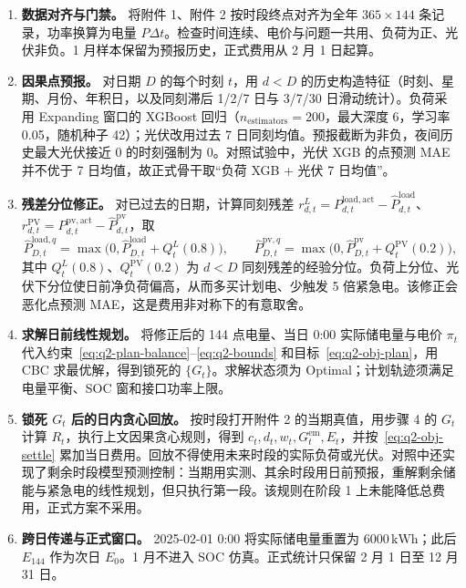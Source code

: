 \begin{enumerate}[label=\textbf{步骤\arabic*},leftmargin=2.6em,itemsep=0.45em]
\item \textbf{数据对齐与门禁。}
将附件 1、附件 2 按时段终点对齐为全年 \(365\times 144\) 条记录，功率换算为电量 \(P\Delta t\)。检查时间连续、电价与问题一共用、负荷为正、光伏非负。1 月样本保留为预报历史，正式费用从 2 月 1 日起算。

\item \textbf{因果点预报。}
对日期 \(D\) 的每个时刻 \(t\)，用 \(d<D\) 的历史构造特征（时刻、星期、月份、年积日，以及同刻滞后 1/2/7 日与 3/7/30 日滑动统计）。负荷采用 Expanding 窗口的 XGBoost 回归（\(n_{\mathrm{estimators}}=200\)，最大深度 6，学习率 0.05，随机种子 42）；光伏改用过去 7 日同刻均值。预报截断为非负，夜间历史最大光伏接近 0 的时刻强制为 0。对照试验中，光伏 XGB 的点预测 MAE 并不优于 7 日均值，故正式骨干取“负荷 XGB + 光伏 7 日均值”。

\item \textbf{残差分位修正。}
对已过去的日期，计算同刻残差 \(r_{d,t}^{L}=P_{d,t}^{\mathrm{load,act}}-\hat{P}_{d,t}^{\mathrm{load}}\)、\(r_{d,t}^{\mathrm{PV}}=P_{d,t}^{\mathrm{pv,act}}-\hat{P}_{d,t}^{\mathrm{pv}}\)，取
\[
\hat{P}_{D,t}^{\mathrm{load},q}
=\max\bigl(0,\hat{P}_{D,t}^{\mathrm{load}}+Q_t^{L}(0.8)\bigr),\qquad
\hat{P}_{D,t}^{\mathrm{pv},q}
=\max\bigl(0,\hat{P}_{D,t}^{\mathrm{pv}}+Q_t^{\mathrm{PV}}(0.2)\bigr),
\]
其中 \(Q_t^{L}(0.8)\)、\(Q_t^{\mathrm{PV}}(0.2)\) 为 \(d<D\) 同刻残差的经验分位。负荷上分位、光伏下分位使日前净负荷偏高，从而多买计划电、少触发 5 倍紧急电。该修正会恶化点预测 MAE，这是费用非对称下的有意取舍。

\item \textbf{求解日前线性规划。}
将修正后的 144 点电量、当日 0:00 实际储电量与电价 \(\pi_t\) 代入约束~\eqref{eq:q2-plan-balance}--\eqref{eq:q2-bounds} 和目标~\eqref{eq:q2-obj-plan}，用 CBC 求最优解，得到锁死的 \(\{G_t\}\)。求解状态须为 Optimal；计划轨迹须满足电量平衡、SOC 窗和接口功率上限。

\item \textbf{锁死 \(G_t\) 后的日内贪心回放。}
按时段打开附件 2 的当期真值，用步骤 4 的 \(G_t\) 计算 \(R_t\)，执行上文因果贪心规则，得到 \(c_t,d_t,w_t,G_t^{\mathrm{em}},E_t\)，并按~\eqref{eq:q2-obj-settle} 累加当日费用。回放不得使用未来时段的实际负荷或光伏。对照中还实现了剩余时段模型预测控制：当期用实测、其余时段用日前预报，重解剩余储能与紧急电的线性规划，但只执行第一段。该规则在阶段 1 上未能降低总费用，正式方案不采用。

\item \textbf{跨日传递与正式窗口。}
2025-02-01 0:00 将实际储电量重置为 \(6000\,\mathrm{kWh}\)；此后 \(E_{144}\) 作为次日 \(E_0\)。1 月不进入 SOC 仿真。正式统计只保留 2 月 1 日至 12 月 31 日。


\end{enumerate}
